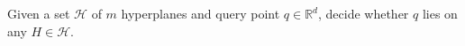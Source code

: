 \begin{problem}\label{problem:point-location-hyperplane}
	Given a set \(\mathcal{H}\) of \(m\) hyperplanes and query point
	\(q\in\mathbb{R}^d\),
	decide whether \(q\) lies on any \(H \in \mathcal{H}\).
\end{problem}
